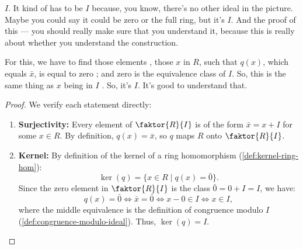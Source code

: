 \begin{speech}[00:06:17 - 00:07:05]
$I$. It kind of has to be $I$  because, you know, there's no other ideal in the picture. Maybe you could say it could be zero or the full ring, but it's $I$. And the proof of this --- you should really make sure that you understand it, because this is really about whether you understand the construction.

For this, we have to find those elements , those $x$ in $R$, such that $q(x)$, which equals $\bar{x}$, is equal to zero ; and zero is the equivalence class of $I$. So, this is the same thing as $x$ being in $I$ . So, it's $I$. It's good to understand that.
\end{speech}

\begin{content}

\begin{proof}
We verify each statement directly:
\begin{enumerate}[label=\textbf{(\roman*)}]
    \item \textbf{Surjectivity:} Every element of $\faktor{R}{I}$ is of the form $\bar{x} = x + I$ for some $x \in R$. By definition, $q(x) = \bar{x}$, so $q$ maps $R$ onto $\faktor{R}{I}$.
    \item \textbf{Kernel:} By definition of the kernel of a ring homomorphism (\cref{def:kernel-ring-hom}):
    \[
    \ker(q) = \{ x \in R \mid q(x) = \bar{0} \}.
    \]
    Since the zero element in $\faktor{R}{I}$ is the class $\bar{0} = 0 + I = I$, we have:
    \[
    q(x) = \bar{0} \iff \bar{x} = \bar{0} \iff x - 0 \in I \iff x \in I,
    \]
    where the middle equivalence is the definition of congruence modulo $I$ (\cref{def:congruence-modulo-ideal}).
    Thus, $\ker(q) = I$.
\end{enumerate}
\end{proof}
\end{content}

